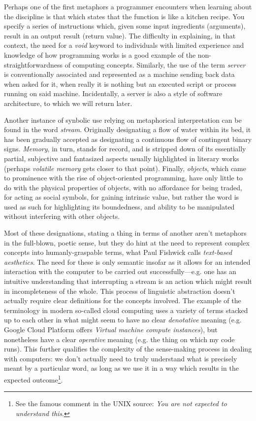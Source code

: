 \documentclass{article}
\begin{document}
Perhaps one of the first metaphors a programmer encounters when learning about the discipline is that which states that the function is like a kitchen recipe. You specify a series of instructions which, given some input ingredients (arguments), result in an output result (return value). The difficulty in explaining, in that context, the need for a \emph{void} keyword to individuals with limited experience and knowledge of how programming works is a good example of the non-straightforwardness of computing concepts. Similarly, the use of the term \emph{server} is conventionally associated and represented as a machine sending back data when asked for it, when really it is nothing but an executed script or process running on said machine. Incidentally, a server is also a style of software architecture, to which we will return later.

Another instance of synbolic use relying on metaphorical interpretation can be found in the word \emph{stream}. Originally designating a flow of water within its bed, it has been gradually accepted as designating a continuous flow of contingent binary signs. \emph{Memory}, in turn, stands for record, and is stripped down of its essentially partial, subjective and fantasized aspects usually highlighted in literary works (perhaps \emph{volatile memory} gets closer to that point). Finally, \emph{objects}, which came to prominence with the rise of object-oriented programming, have only little to do with the physical properties of objects, with no affordance for being traded, for acting as social symbols, for gaining intrinsic value, but rather the word is used as such for highlighting its boundedness, and ability to be manipulated without interfering with other objects.

Most of these designations, stating a thing in terms of another aren't metaphors in the full-blown, poetic sense, but they do hint at the need to represent complex concepts into humanly-graspable terms, what Paul Fishwick calls \emph{text-based aesthetics}\cite{fishwick_aesthetic_2001}. The need for these is only semantic insofar as it allows for an intended interaction with the computer to be carried out successfully—e.g. one has an intuitive understanding that interrupting a stream is an action which might result in incompleteness of the whole. This process of linguistic abstraction doesn't actually require clear definitions for the concepts involved. The example of the terminology in modern so-called cloud computing uses a variety of terms stacked up to each other in what might seem to have no clear \emph{denotative} meaning (e.g. Google Cloud Platform offers \emph{Virtual machine compute instances}), but nonetheless have a clear \emph{operative} meaning (e.g. the thing on which my code runs). This further qualifies the complexity of the sense-making process in dealing with computers: we don't actually need to truly understand what is precisely meant by a particular word, as long as we use it in a way which results in the expected outcome\footnote{See the famous comment in the UNIX source: \emph{You are not expected to understand this}.}.
\end{document}
